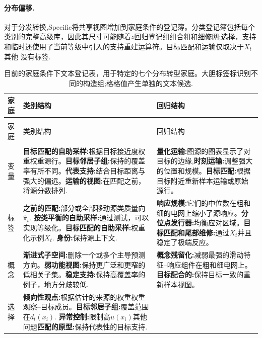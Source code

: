 \paragraph{分布偏移.}对于分发转换,Specific将共享视图增加到家庭条件的登记簿。分类登记簿包括每个类别的完整高级库，因此其尺寸可能随着$z$回归登记组组合粗和细修网;选择，支持和临时还使用了当前等级中引入的支持重建运算符。目标匹配和运输仅取决于$X_t$其他
没有标签.

\begingroup
  \footnotesize
  \setlength{\LTpre}{0.45\baselineskip}
  \setlength{\LTpost}{0.45\baselineskip}
  \begin{longtable}{@{}>{\raggedright\arraybackslash}p{} >{\raggedright\arraybackslash}p{} >{\raggedright\arraybackslash}p{}@{}}
    \caption{目前的家庭条件下文本登记表，用于特定的七个分布转型家庭。大胆标签标识别不同的构造组;格格值产生单独的文本候选.}
    \label{tab:specific-shift-contexts} \\
    \toprule 家庭&类别结构&回归结构\\
    \midrule
    \endfirsthead
    \multicolumn{3}{@{}l}{\tablename~\thetable\ （续）} \\
    \toprule 家庭&类别结构&回归结构\\
    \midrule
    \endhead
    \midrule
    \multicolumn{3}{r@{}}{在下一页继续} \\
    \endfoot
    \bottomrule
    \endlastfoot 变量& \textbf{目标匹配的自助采样:}根据目标接近度权重权重源行。\textbf{目标邻居子组:}保持的覆盖率有所不同。\textbf{代表支持:}结合目标距离与强大的偏远。\textbf{运输的视图:}在匹配之前，将源分数排列.
      & \textbf{量化运输:}图源的图表显示了对目标的边缘,\textbf{时刻运输:}调整强大的位置和规模。\textbf{目标匹配:}根据目标附近重新样本运输或原始源行。\\
标签& \textbf{之前的匹配:}部分或全部移动源类质量向$\hat\pi_t$. \textbf{按类平衡的自助采样:}通过测试，可以实现等级化。\textbf{目标匹配的自助采样:}权重化示例$X_t$. \textbf{身份:}保持源上下文.
      & \textbf{响应规模:}它们的中位数在粗和细的电网上缩小了源响应。\textbf{分位点发行器:}均衡应对区域。\textbf{目标匹配和尾部维修:}通过$X_t$并且稳定了极端反应。\\
概念& \textbf{渐进式子空间:}删除一个或多个主导预测方向。\textbf{弱功能视图:}保持更广泛和更窄的低相关子集。\textbf{稳定支持:}保持高覆盖率的例子，地方分歧较低.
      & \textbf{概念残留化:}减弱最强的滑动特征--响应组件在粗和细电网上。\textbf{目标配合的:}保持目标一致的重新样本视图。\\
选择& \textbf{倾向性观点:}根据估计的来源的权重权重观察--目标成员。\textbf{目标邻居子组:}覆盖范围在$d_t(x_i)$. \textbf{异常控制:}限制高$u(x_i)$其他问题\textbf{匹配的原型:}保持代表性的目标支持.

\end{longtable}
